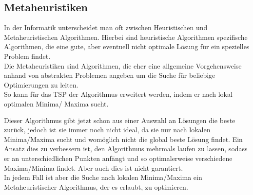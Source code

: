 \documentclass[
../../AuD-Zusammenfassung.tex,
]
{subfiles}
\begin{document}
\subsection{Metaheuristiken}
In der Informatik unterscheidet man oft zwischen Heuristischen und Metaheuristischen Algorithmen. Hierbei sind heuristische Algorithmen spezifische Algorithmen, die eine gute, aber eventuell nicht optimale Lösung für ein spezielles Problem findet. \\
Die Metaheuristiken sind Algorithmen, die eher eine allgemeine Vorgehensweise anhand von abstrakten Problemen angeben um die Suche für beliebige Optimierungen zu leiten.\\

So kann für das TSP der Algorithmus erweitert werden, indem er nach lokal optimalen Minima/ Maxima sucht.
\begin{algorithm}[H]
\end{algorithm}
Dieser Algorithmus gibt jetzt schon aus einer Auswahl an Lösungen die beste zurück, jedoch ist sie immer noch nicht ideal, da sie nur nach lokalen Minima/Maxima sucht und womöglich nicht die global beste Lösung findet. Ein Ansatz dies zu verbessern ist, den Algorithmus mehrmals laufen zu lassen, sodass er an unterschiedlichen Punkten anfängt und so optimalerweise verschiedene Maxima/Minima findet. Aber auch dies ist nicht garantiert.\\
In jedem Fall ist aber die Suche nach lokalen Minima/Maxima ein Metaheuristischer Algorithmus, der es erlaubt, zu optimieren. \\

\end{document}

